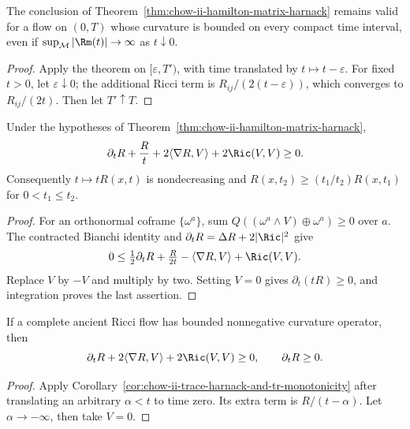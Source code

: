 \begin{remark}
\label{rem:chow-ii-harnack-open-initial-time}
The conclusion of Theorem~\ref{thm:chow-ii-hamilton-matrix-harnack} remains
valid for a flow on \((0,T)\) whose curvature is bounded on every compact time
interval, even if \(\sup_{\mathcal M}|\Rm(t)|\to\infty\) as \(t\downarrow0\).
\end{remark}
\begin{proof}
\sketch Apply the theorem on \([\varepsilon,T')\), with time translated by
\(t\mapsto t-\varepsilon\).  For fixed \(t>0\), let
\(\varepsilon\downarrow0\); the additional Ricci term is
\(R_{ij}/(2(t-\varepsilon))\), which converges to \(R_{ij}/(2t)\).
Then let \(T'\uparrow T\).
\end{proof}

\begin{corollary}
\label{cor:chow-ii-trace-harnack-and-tr-monotonicity}
Under the hypotheses of Theorem~\ref{thm:chow-ii-hamilton-matrix-harnack},
\[
\partial_tR+\frac Rt+2\langle\nabla R,V\rangle+2\Ric(V,V)\ge0.
\]
Consequently \(t\mapsto tR(x,t)\) is nondecreasing and
\(R(x,t_2)\ge(t_1/t_2)R(x,t_1)\) for \(0<t_1\le t_2\).
\end{corollary}
\begin{proof}
\sketch For an orthonormal coframe \(\{\omega^a\}\), sum
\(Q((\omega^a\wedge V)\oplus\omega^a)\ge0\) over \(a\).  The contracted
Bianchi identity and \(\partial_tR=\Delta R+2|\Ric|^2\) give
\[
0\le\tfrac12\partial_tR+\tfrac{R}{2t}-\langle\nabla R,V\rangle+\Ric(V,V).
\]
Replace \(V\) by \(-V\) and multiply by two.  Setting \(V=0\) gives
\(\partial_t(tR)\ge0\), and integration proves the last assertion.
\end{proof}

\begin{corollary}
\label{cor:chow-ii-ancient-trace-harnack}
If a complete ancient Ricci flow has bounded nonnegative curvature operator,
then
\[
\partial_tR+2\langle\nabla R,V\rangle+2\Ric(V,V)\ge0,
\qquad \partial_tR\ge0.
\]
\end{corollary}
\begin{proof}
\sketch Apply Corollary~\ref{cor:chow-ii-trace-harnack-and-tr-monotonicity} after
translating an arbitrary \(\alpha<t\) to time zero.  Its extra term is
\(R/(t-\alpha)\).  Let \(\alpha\to-\infty\), then take \(V=0\).
\end{proof}

